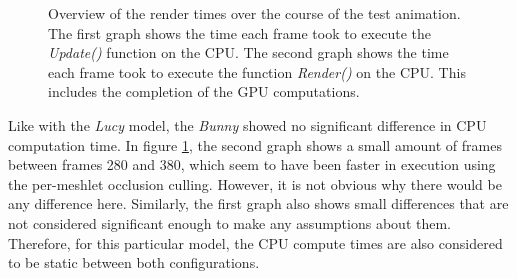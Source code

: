 \begin{figure}[!htb]              %
  \begin{center}
    \caption{Overview of the render times over the course of the test animation. The first graph shows the time 
    each frame took to execute the \emph{Update()} function on the \ac{CPU}. The second graph shows the time each 
    frame took to execute the function \emph{Render()} on the \ac{CPU}. This includes the completion of the 
    \ac{GPU} computations.}
    \label{plt:bunny-256-culling-cpu-time}
  \end{center}
\end{figure}


\noindent
Like with the \emph{Lucy} model, the \emph{Bunny} showed no significant difference in \ac{CPU} computation time. 
In figure \ref{plt:bunny-256-culling-cpu-time}, the second graph shows a small amount of frames between frames 280 
and 380, which seem to have been faster in execution using the per-meshlet occlusion culling. However, it is not 
obvious why there would be any difference here. Similarly, the first graph also shows small differences that are 
not considered significant enough to make any assumptions about them. Therefore, for this particular model, the 
\ac{CPU} compute times are also considered to be static between both configurations.

